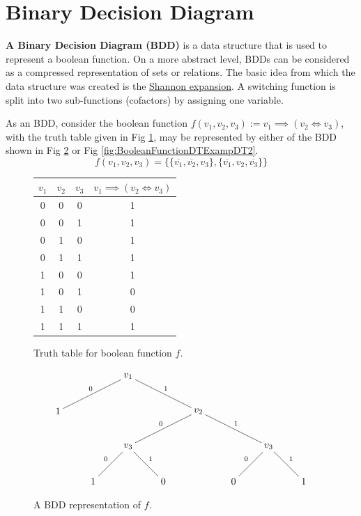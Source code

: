 \documentclass[12pt]{book}
\begin{document}
\section{Binary Decision Diagram}
\label{sec:Binary Decision Diagram}
\begin{defi}\label{def:bdd} \textbf{A Binary Decision Diagram (BDD)} is a data structure that is used to represent a boolean function. 
On a more abstract level, BDDs can be considered as a compressed representation of sets or relations. 
The basic idea from which the data structure was created is the \href{https://en.wikipedia.org/wiki/Boole%27s_expansion_theorem}{Shannon expansion}. A switching function is split into two sub-functions (cofactors) by assigning one variable. 
\end{defi} 
\begin{examp}\label{exp:bdd}
As an BDD, consider the boolean function $f(v_1,v_2,v_3) := v_1 \implies (v_2 \iff v_3)$, with the truth table given in Fig \ref{fig:BooleanFunctionDTExampTT}, may be represented by either of the BDD shown in Fig \ref{fig:BooleanFunctionDTExampDT1} or Fig \ref{fig:BooleanFunctionDTExampDT2}. 
$$f(v_1,v_2,v_3) = \{ \{ \overline{v_1},\overline{v_2}, v_3 \}, \{ \overline{v_1}, v_2, \overline{v_3}\} \}$$
\begin{figure}[h]
  \centering
  \begin{tabular}{|c|c|c|c|} 
    \hline
    $v_1$ & $v_2$ & $v_3$ & $v_1 \implies (v_2 \iff v_3)$ \\ \hline
     0 & 0 & 0 & 1 \\ \hline
     0 & 0 & 1 & 1 \\ \hline
     0 & 1 & 0 & 1 \\ \hline
     0 & 1 & 1 & 1 \\ \hline
     1 & 0 & 0 & 1 \\ \hline
     1 & 0 & 1 & 0 \\ \hline
     1 & 1 & 0 & 0 \\ \hline
     1 & 1 & 1 & 1 \\ \hline
     \end{tabular}
  \caption{Truth table for boolean function $f$.}
  \label{fig:BooleanFunctionDTExampTT}
\end{figure}
\begin{figure}[h]
  \centering
  \begin{displaymath}
    \xygraph{
      []{v_1} ( 
        - [dll]{1}_0 (),
        - [drr]{v_2}^1 (
          - [dll]{v_3}_0 (
            - [dl]{1}_0 (),
            - [dr]{0}^1 ()
          ),
          -[drr]{v_3}^1 (
            - [dl]{0}_0 (),
            - [dr]{1}^1 ()
          )
          )
        )
      }
  \end{displaymath}
  \caption{A BDD representation of $f$.}
  \label{fig:BooleanFunctionDTExampDT1}
\end{figure}


\end{examp}
\end{document}
